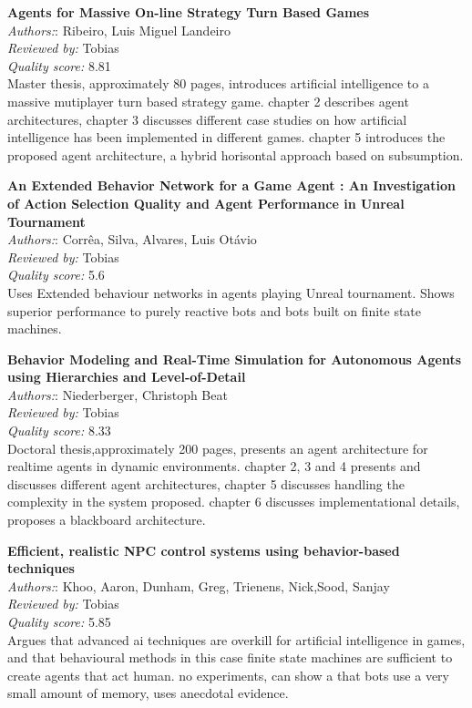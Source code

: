 \textbf{Agents for Massive On-line Strategy Turn Based Games}\\
\textit{Authors:}: Ribeiro, Luis Miguel Landeiro\\
\textit{Reviewed by:} Tobias\\
\textit{Quality score:} 8.81\\
Master thesis, approximately 80 pages, introduces artificial intelligence to a massive mutiplayer turn based strategy game. chapter 2 describes agent architectures, chapter 3 discusses different case studies on how artificial intelligence has been implemented in different games. chapter 5 introduces the proposed agent architecture, a hybrid horisontal approach based on subsumption.

\textbf{An Extended Behavior Network for a Game Agent : An Investigation of Action Selection Quality and Agent Performance in Unreal Tournament}\\
\textit{Authors:}: Corr\^{e}a, Silva, Alvares, Luis Ot\'{a}vio\\
\textit{Reviewed by:} Tobias\\
\textit{Quality score:} 5.6\\
Uses Extended behaviour networks in agents playing Unreal tournament. Shows superior performance to purely reactive bots and bots built on finite state machines.



\textbf{Behavior Modeling and Real-Time Simulation for Autonomous Agents using Hierarchies and Level-of-Detail}\\
\textit{Authors:}: Niederberger, Christoph Beat\\
\textit{Reviewed by:} Tobias\\
\textit{Quality score:} 8.33\\
Doctoral thesis,approximately 200 pages, presents an agent architecture for realtime agents in dynamic environments. chapter 2, 3 and 4 presents and discusses different agent architectures, chapter 5 discusses handling the complexity in the system proposed. chapter 6 discusses implementational details, proposes a blackboard architecture.

\textbf{Efficient, realistic NPC control systems using behavior-based techniques}\\
\textit{Authors:}: Khoo, Aaron, Dunham, Greg, Trienens, Nick,Sood, Sanjay\\
\textit{Reviewed by:} Tobias\\
\textit{Quality score:} 5.85\\
Argues that advanced ai techniques are overkill for artificial intelligence in games, and that behavioural methods in this case finite state machines are sufficient to create agents that act human. no experiments, can show a that bots use a very small amount of memory, uses  anecdotal evidence.

